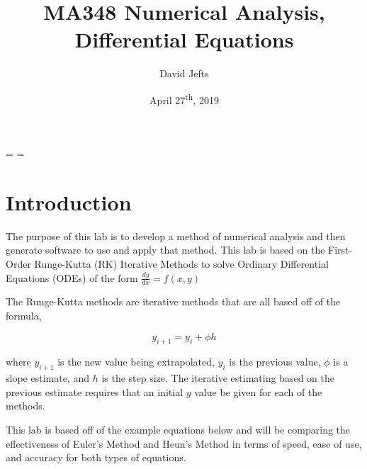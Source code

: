 \documentclass[12pt, letterpaper]{article}
\begin{document}
\setcounter{secnumdepth}{-1}
\binoppenalty=\maxdimen
\relpenalty=\maxdimen

\setlength{\abovedisplayskip}{-\baselineskip}
\setlength{\belowdisplayskip}{0\baselineskip}
\setlength{\abovedisplayshortskip}{0\baselineskip}


\title{MA348 Numerical Analysis, Differential Equations}
\author{David Jefts}
\date{April 27\textsuperscript{th}, 2019}
\begin{titlepage}
	\centering
	\maketitle
	\centering
	\hfill
	\vfill
	\thispagestyle{empty}
\end{titlepage}

\setlength{\voffset}{-0.5in}
\setlength{\headsep}{10pt}

\section{\label{sec:intro}Introduction}
	The purpose of this lab is to develop a method of numerical analysis and then generate software to use and apply that method. This lab is based on the First-Order Runge-Kutta (RK) Iterative Methods to solve Ordinary Differential Equations (ODEs) of the form $\frac{dy}{dx}=f(x,y)$
	 
	 The Runge-Kutta methods are iterative methods that are all based off of the formula,
	 
	 \begin{equation}y_{i+1}=y_i + \phi h\end{equation}
	 
	 where $y_{i+1}$ is the new value being extrapolated, $y_i$ is the previous value, $\phi$ is a slope estimate, and $h$ is the step size. The iterative estimating based on the previous estimate requires that an initial $y$ value be given for each of the methods.
	 
	 This lab is based off of the example equations below and will be comparing the effectiveness of Euler's Method and Heun's Method in terms of speed, ease of use, and accuracy for both types of equations. 
	 
\end{document}
